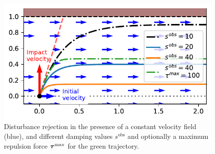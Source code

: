 \begin{figure}[htb]
\centering
  \centerline{\includegraphics[width=0.99\columnwidth]{figures/parallel_avoidance_obstacle}}
  \caption{Disturbance rejection in the presence of a constant velocity field (blue), and different damping values $s^{\mathrm{obs}}$ and optionally a maximum repulsion force $\boldsymbol{\tau}^{\mathrm{max}}$ for the green trajectory.}
  \label{fig:disturbance_with_parallel_velocity}
\end{figure}

